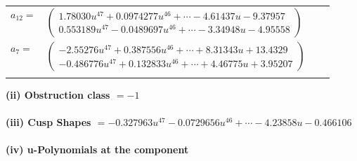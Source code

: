 \documentclass[1p]{elsarticle_modified}
\theoremstyle{definition}
\begin{document}
\begin{tabular}{m{7pt} m{180pt} m{7pt} m{180pt} }
\flushright $a_{12}=$&$\begin{pmatrix}1.78030 u^{47}+0.0974277 u^{46}+\cdots-4.61437 u-9.37957\\0.553189 u^{47}-0.0489697 u^{46}+\cdots-3.34948 u-4.95558\end{pmatrix}$ \\
\flushright $a_{7}=$&$\begin{pmatrix}-2.55276 u^{47}+0.387556 u^{46}+\cdots+8.31343 u+13.4329\\-0.486776 u^{47}+0.132833 u^{46}+\cdots+4.46775 u+3.95207\end{pmatrix}$\\&\end{tabular}
\flushleft \textbf{(ii) Obstruction class $= -1$}\\~\\
\flushleft \textbf{(iii) Cusp Shapes $= -0.327963 u^{47}-0.0729656 u^{46}+\cdots-4.23858 u-0.466106$}\\~\\
\newpage\renewcommand{\arraystretch}{1}
\flushleft \textbf{(iv) u-Polynomials at the component}\newline \\
\end{document}
